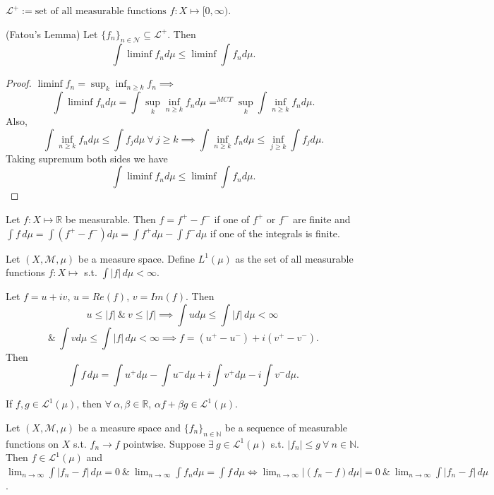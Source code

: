 \documentclass{functionspaces}
\begin{document}
\begingroup
\setlength{\parskip}{6pt}

$\mathcal{L}^{+}:=\text{set of all measurable functions }f:X\mapsto[0,\infty)$.

\begin{lemma}\label{lem:fatou}(Fatou's Lemma)
Let $\{f_{n}\}_{n\in\mathcal{N}}\subseteq\mathcal{L}^{+}$. Then
\[
\int\liminf f_{n}d\mu\leq\liminf\int f_{n}d\mu.
\]
\end{lemma}

\begin{proof}
$\liminf f_{n}=\sup_{k}\inf_{n\geq k}f_{n}\implies$
\[
\int\liminf f_{n}d\mu=\int\sup_{k}\inf_{n\geq k}f_{n}d\mu=^{MCT}\sup_{k}\int\inf_{n\geq k}f_{n}d\mu.
\]
Also,
\[
\int\inf_{n\geq k}f_{n}d\mu\leq\int f_{j}d\mu\ \forall\ j\geq k\implies\int\inf_{n\geq k}f_{n}d\mu\leq\inf_{j\geq k}\int f_{j}d\mu.
\]
Taking supremum both sides we have
\[
\int\liminf f_{n}d\mu\leq\liminf\int f_{n}d\mu.
\]
\end{proof}

Let $f:X\mapsto\mathbb{R}$ be measurable. Then $f=f^{+}-f^{-}$ if one of $f^{+}$ or $f^{-}$ are finite and $\int f\,d\mu=\int(f^{+}-f^{-})d\mu=\int f^{+}d\mu-\int f^{-}d\mu$ if one of the integrals is finite.

\begin{definition}\label{def:L1}
Let $(X,\mathcal{M},\mu)$ be a measure space. Define $L^{1}(\mu)$ as the set of all measurable functions $f:X\mapsto$ s.t. $\int|f|\,d\mu<\infty$.
\end{definition}

Let $f=u+iv$, $u=Re(f)$, $v=Im(f)$. Then
\[
u\leq|f|\ \&\ v\leq|f|\implies\int ud\mu\leq\int|f|\,d\mu<\infty\ 
\]
\[
\&\ \int vd\mu\leq\int|f|\,d\mu<\infty\implies f=(u^{+}-u^{-})+i(v^{+}-v^{-}).
\]
Then
\[
\int f\,d\mu=\int u^{+}d\mu-\int u^{-}d\mu+i\int v^{+}d\mu-i\int v^{-}d\mu.
\]

\begin{proposition}\label{prop:L1_vector}
If $f,g\in\mathcal{L}^{1}(\mu)$, then $\forall\ \alpha,\beta\in\mathbb{R}$, $\alpha f+\beta g\in\mathcal{L}^{1}(\mu)$.
\end{proposition}

\begin{theorem}
Let $(X,\mathcal{M},\mu)$ be a measure space and $\{f_{n}\}_{n\in\mathbb{N}}$ be a sequence of measurable functions on $X$ s.t. $f_{n}\to f$ pointwise. Suppose $\exists\ g\in\mathcal{L}^{1}(\mu)$ s.t. $|f_{n}|\leq g\ \forall\ n\in\mathbb{N}$. Then $f\in\mathcal{L}^{1}(\mu)$ and $\lim_{n\to\infty}\int|f_{n}-f|\,d\mu=0\ \&\ \lim_{n\to\infty}\int f_{n}d\mu=\int f\,d\mu\iff\lim_{n\to\infty}|(f_{n}-f)d\mu|=0\ \&\ \lim_{n\to\infty}\int|f_{n}-f|\,d\mu$.
\end{theorem}
\end{document}
